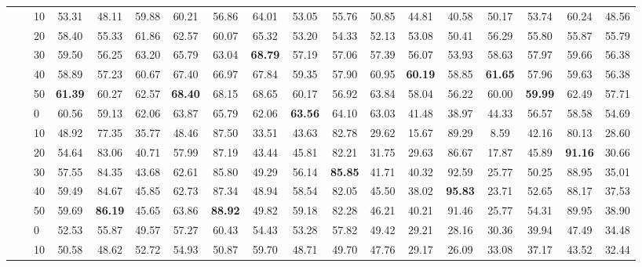 \begin{table*}[!h]
{\begin{tabular}{lllccc|ccc|ccc|ccc|ccc}
 \textbf{} & \textbf{} & 10 & 53.31 & 48.11 & 59.88 & 60.21 & 56.86 & 64.01 & 53.05 & 55.76 & 50.85 & 44.81 & 40.58 & 50.17 & 53.74 & 60.24 & 48.56 \\ 
 \textbf{} & \textbf{} & 20 & 58.40 & 55.33 & 61.86 & 62.57 & 60.07 & 65.32 & 53.20 & 54.33 & 52.13 & 53.08 & 50.41 & 56.29 & 55.80 & 55.87 & 55.79 \\ 
 \textbf{} & \textbf{} & 30 & 59.50 & 56.25 & 63.20 & 65.79 & 63.04 & \textbf{68.79} & 57.19 & 57.06 & 57.39 & 56.07 & 53.93 & 58.63 & 57.97 & 59.66 & 56.38 \\ 
 \textbf{} & \textbf{} & 40 & 58.89 & 57.23 & 60.67 & 67.40 & 66.97 & 67.84 & 59.35 & 57.90 & 60.95 & \textbf{60.19} & 58.85 & \textbf{61.65} & 57.96 & 59.63 & 56.38 \\ 
 \textbf{} & \textbf{} & 50 & \textbf{61.39} & 60.27 & 62.57 & \textbf{68.40} & 68.15 & 68.65 & 60.17 & 56.92 & 63.84 & 58.04 & 56.22 & 60.00 & \textbf{59.99} & 62.49 & 57.71 \\ 
 \arrayrulecolor{gray}\cline{2-18}\arrayrulecolor{black}
\textbf{} & \textbf{\multirow{6}{*}{SC}} & 0 & 60.56 & 59.13 & 62.06 & 63.87 & 65.79 & 62.06 & \textbf{63.56} & 64.10 & 63.03 & 41.48 & 38.97 & 44.33 & 56.57 & 58.58 & 54.69 \\ 
 \textbf{} & \textbf{} & 10 & 48.92 & 77.35 & 35.77 & 48.46 & 87.50 & 33.51 & 43.63 & 82.78 & 29.62 & 15.67 & 89.29 & 8.59 & 42.16 & 80.13 & 28.60 \\ 
 \textbf{} & \textbf{} & 20 & 54.64 & 83.06 & 40.71 & 57.99 & 87.19 & 43.44 & 45.81 & 82.21 & 31.75 & 29.63 & 86.67 & 17.87 & 45.89 & \textbf{91.16} & 30.66 \\ 
 \textbf{} & \textbf{} & 30 & 57.55 & 84.35 & 43.68 & 62.61 & 85.80 & 49.29 & 56.14 & \textbf{85.85} & 41.71 & 40.32 & 92.59 & 25.77 & 50.25 & 88.95 & 35.01 \\ 
 \textbf{} & \textbf{} & 40 & 59.49 & 84.67 & 45.85 & 62.73 & 87.34 & 48.94 & 58.54 & 82.05 & 45.50 & 38.02 & \textbf{95.83} & 23.71 & 52.65 & 88.17 & 37.53 \\ 
 \textbf{} & \textbf{} & 50 & 59.69 & \textbf{86.19} & 45.65 & 63.86 & \textbf{88.92} & 49.82 & 59.18 & 82.28 & 46.21 & 40.21 & 91.46 & 25.77 & 54.31 & 89.95 & 38.90 \\ 
\hline
\arrayrulecolor{gray}\cline{2-18}\arrayrulecolor{black}
\textbf{\multirow{12}{*}{Opinion Term}} & \textbf{\multirow{6}{*}{-}} & 0 & 52.53 & 55.87 & 49.57 & 57.27 & 60.43 & 54.43 & 53.28 & 57.82 & 49.42 & 29.21 & 28.16 & 30.36 & 39.94 & 47.49 & 34.48 \\ 
 \textbf{} & \textbf{} & 10 & 50.58 & 48.62 & 52.72 & 54.93 & 50.87 & 59.70 & 48.71 & 49.70 & 47.76 & 29.17 & 26.09 & 33.08 & 37.17 & 43.52 & 32.44 \\ 

\end{tabular}}
\end{table*}
